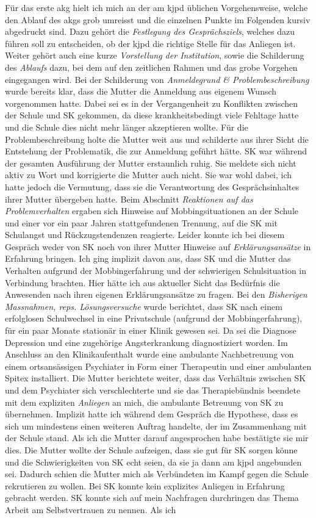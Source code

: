 Für das erste \ac{akg} hielt ich mich an der am \ac{kjpd} üblichen Vorgehensweise, welche den Ablauf des \acp{akg} grob umreisst und die einzelnen Punkte im Folgenden kursiv abgedruckt sind. Dazu gehört die \textit{Festlegung des Gesprächsziels}, welches dazu führen soll zu entscheiden, ob der \ac{kjpd} die richtige Stelle für das Anliegen ist. Weiter gehört auch eine kurze \textit{Vorstellung der Institution}, sowie die Schilderung des \textit{Ablaufs} dazu, bei dem auf den zeitlichen Rahmen und das grobe Vorgehen eingegangen wird. Bei der Schilderung von \textit{Anmeldegrund \& Problembeschreibung} wurde bereits klar, dass die Mutter die Anmeldung aus eigenem Wunsch vorgenommen hatte. Dabei sei es in der Vergangenheit zu Konflikten zwischen der Schule und SK gekommen, da diese krankheitsbedingt viele Fehltage hatte und die Schule dies nicht mehr länger akzeptieren wollte. Für die Problembeschreibung holte die Mutter weit aus und schilderte aus ihrer Sicht die Entstehung der Problematik, die zur Anmeldung geführt hätte. SK war während der gesamten Ausführung der Mutter erstaunlich ruhig. Sie meldete sich nicht aktiv zu Wort und korrigierte die Mutter auch nicht. Sie war wohl dabei, ich hatte jedoch die Vermutung, dass sie die Verantwortung des Gesprächsinhaltes ihrer Mutter übergeben hatte. Beim Abschnitt \textit{Reaktionen auf das Problemverhalten} ergaben sich Hinweise auf Mobbingsituationen an der Schule und einer vor ein paar Jahren stattgefundenen Trennung, auf die SK mit Schulangst und Rückzugstendenzen reagierte. Leider konnte ich bei diesem Gespräch weder von SK noch von ihrer Mutter Hinweise auf \textit{Erklärungsansätze} in Erfahrung bringen. Ich ging implizit davon aus, dass SK und die Mutter das Verhalten aufgrund der Mobbingerfahrung und der schwierigen Schulsituation in Verbindung brachten. Hier hätte ich aus aktueller Sicht das Bedürfnis die Anwesenden nach ihren eigenen Erklärungsansätze zu fragen. Bei den \textit{Bisherigen Massnahmen, reps. Lösungsversuche} wurde berichtet, dass SK nach einem erfolglosen Schulwechsel in eine Privatschule (aufgrund der Mobbingerfahrung), für ein paar Monate stationär in einer Klinik gewesen sei. Da sei die Diagnose Depression und eine zugehörige Angsterkrankung diagnostiziert worden. Im Anschluss an den Klinikaufenthalt wurde eine ambulante Nachbetreuung von einem ortsansässigen Psychiater in Form einer Therapeutin und einer ambulanten Spitex installiert. Die Mutter berichtete weiter, dass das Verhältnis zwischen SK und dem Psychiater sich verschlechterte und sie das Therapiebündnis beendete mit dem expliziten \textit{Anliegen} an mich, die ambulante Betreuung von SK zu übernehmen. Implizit hatte ich während dem Gespräch die Hypothese, dass es sich um mindestens einen weiteren Auftrag handelte, der im Zusammenhang mit der Schule stand. Als ich die Mutter darauf angesprochen habe bestätigte sie mir dies. Die Mutter wollte der Schule aufzeigen, dass sie gut für SK sorgen könne und die Schwierigkeiten von SK echt seien, da sie ja dann am \ac{kjpd} angebunden sei. Dadurch schien die Mutter mich als Verbündeten im Kampf gegen die Schule rekrutieren zu wollen. Bei SK konnte kein explizites Anliegen in Erfahrung gebracht werden. SK konnte sich auf mein Nachfragen durchringen das Thema Arbeit am Selbstvertrauen zu nennen. Als ich 